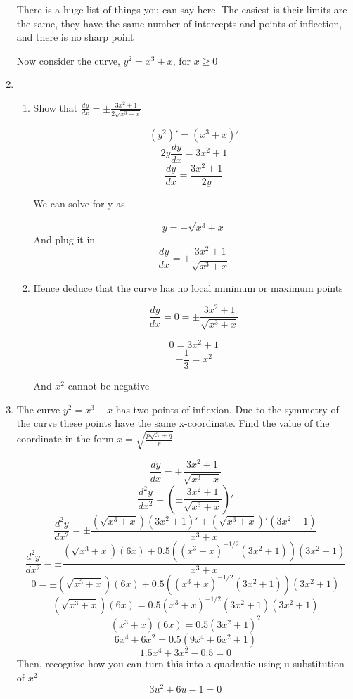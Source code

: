 \documentclass[../main.tex]{subfiles}
\begin{document}
\begin{enumerate}
    There is a huge list of things you can say here. The easiest is their limits are the same, they have the same number of intercepts and points of inflection, and there is no sharp point
    
    Now consider the curve, $y^2 = x^3 +x$, for $x \geq 0$
    
    \item
        \begin{enumerate}
            \item Show that $\frac{dy}{dx} = \pm \frac{3x^2 + 1}{2\sqrt{x^3 + x}}$


                \[ (y^2)' = (x^3 + x)' \]
                \[ 2y \frac{dy}{dx} = 3x^2 + 1 \]
                \[\frac{dy}{dx} = \frac{3x^2 + 1}{2y} \]

                We can solve for y as

                \[ y = \pm \sqrt{x^3 + x} \] 
                And plug it in 
                \[\frac{dy}{dx} = \pm \frac{3x^2 + 1}{\sqrt{x^3 + x}} \]

            \item Hence deduce that the curve has no local minimum or maximum points

            \[\frac{dy}{dx} = 0 = \pm \frac{3x^2 + 1}{\sqrt{x^3 + x}} \]

            \[ 0 = 3x^2 + 1 \]
            \[-\frac{1}{3} = x^2 \] 

            And $x^2$ cannot be negative
        \end{enumerate}
    \item The curve $y^2 = x^3 + x$ has two points of inflexion. Due to the symmetry of the curve these points have the same x-coordinate. Find the value of the coordinate in the form $x=\sqrt{\frac{p\sqrt{3} + q}{r}}$
        
        \[\frac{dy}{dx} = \pm \frac{3x^2 + 1}{\sqrt{x^3 + x}} \]
        \[\frac{d^2y}{dx^2} = (\pm \frac{3x^2 + 1}{\sqrt{x^3 + x}})' \]
        \[\frac{d^2y}{dx^2} = \pm \frac{(\sqrt{x^3 + x})(3x^2 + 1)' + (\sqrt{x^3 + x})'(3x^2 + 1)}{x^3 + x}\]
        \[\frac{d^2y}{dx^2} = \pm \frac{(\sqrt{x^3 + x})(6x) + 0.5((x^3 + x)^{-1/2} (3x^2 + 1))(3x^2 + 1)}{x^3 + x}\]
        \[0 = \pm (\sqrt{x^3 + x})(6x) + 0.5((x^3 + x)^{-1/2} (3x^2 + 1))(3x^2 + 1)\]
        \[(\sqrt{x^3 + x})(6x) =  0.5(x^3 + x)^{-1/2} (3x^2 + 1)(3x^2 + 1) \]
        \[ (x^3 + x)(6x) = 0.5(3x^2 + 1)^2 \] 
        \[ 6x^4 + 6x^2 = 0.5(9x^4 + 6x^2 + 1) \]
        \[ 1.5x^4 +3x^2 - 0.5 = 0 \]
        Then, recognize how you can turn this into a quadratic using u substitution of $x^2$
        \[ 3u^2 + 6u -1 = 0 \]


\end{enumerate}
\end{document}
